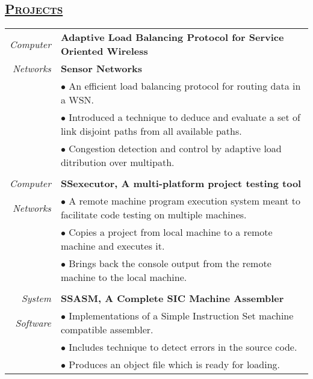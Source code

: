 \documentclass[14pt]{article}
\begin{document}
\subsection* {\scshape\LARGE\uline {Projects}}
\begin{tabularx}{\textwidth}{r X}
\emph{Computer} & \textbf{Adaptive Load Balancing Protocol for Service Oriented Wireless} \\
\emph{Networks} & \textbf{Sensor Networks} \\
                             & $\bullet$  An efficient load balancing protocol for routing data in a WSN. \\
                             & $\bullet$ Introduced a technique to deduce and evaluate a set of link disjoint paths from all available paths. \\
				   & $\bullet$ Congestion detection and control by adaptive load ditribution over multipath. \\
\\
\emph{Computer} & \textbf{SSexecutor, A multi-platform project testing tool} \\
\emph{Networks} & $\bullet$ A remote machine program execution system meant to facilitate code testing on multiple machines. \\
                             & $\bullet$ Copies a project from local machine to a remote machine and executes it. \\
				   & $\bullet$ Brings back the console output from the remote machine to the local machine. \\
\\
\emph{System} & \textbf{SSASM, A Complete SIC Machine Assembler} \\
\emph{Software} & $\bullet$ Implementations of a Simple Instruction Set machine compatible assembler. \\
				& $\bullet$ Includes technique to detect errors in the source code. \\
				& $\bullet$ Produces an object file which is ready for loading. 
\end{tabularx}
\end{document}
